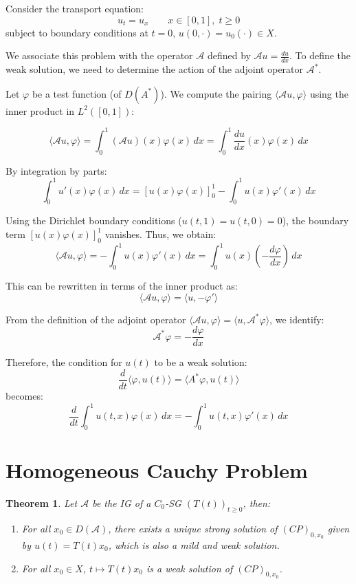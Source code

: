\documentclass[12pt, oneside]{book}
\newtheorem{theo}{Theorem}[section]
\newcommand{\A}{\mathscr{A}}
\begin{document}
\begin{example}
Consider the transport equation:
$$
u_t = u_x \quad\quad x \in [0,1], \; t \ge 0
$$
subject to boundary conditions at $t=0$, $u(0, \cdot) = u_0(\cdot) \in X$.

We associate this problem with the operator $\A$ defined by $\A u = \frac{du}{dx}$. To define the weak solution, we need to determine the action of the adjoint operator $\A^*$.

Let $\varphi$ be a test function (of $D(A^*)$). We compute the pairing $\langle \A u, \varphi \rangle$ using the inner product in $L^2([0,1])$:

$$ \langle \A u, \varphi \rangle = \int_0^1 (\A u)(x) \varphi(x) \, dx = \int_0^1 \frac{du}{dx}(x) \varphi(x) \, dx $$

By integration by parts:
$$ \int_0^1 u'(x) \varphi(x) \, dx = \left[ u(x)\varphi(x) \right]_0^1 - \int_0^1 u(x) \varphi'(x) \, dx $$

Using the Dirichlet boundary conditions ($u(t,1) = u(t,0) = 0$), the boundary term $\left[ u(x)\varphi(x) \right]_0^1$ vanishes. Thus, we obtain:
$$ \langle \A u, \varphi \rangle = - \int_0^1 u(x) \varphi'(x) \, dx = \int_0^1 u(x) \left( -\frac{d\varphi}{dx} \right) \, dx $$

This can be rewritten in terms of the inner product as:
$$ \langle \A u, \varphi \rangle = \langle u, -\varphi' \rangle $$

From the definition of the adjoint operator $\langle \A u, \varphi \rangle = \langle u, \A^* \varphi \rangle$, we identify:
$$ \A^* \varphi = -\frac{d\varphi}{dx} $$

Therefore, the condition for $u(t)$ to be a weak solution:
$$ \frac{d}{dt} \langle \varphi, u(t) \rangle = \langle A^* \varphi, u(t) \rangle $$
becomes:
$$ \frac{d}{dt} \int_0^1 u(t,x) \varphi(x) \, dx = -\int_0^1 u(t,x) \varphi'(x) \, dx $$
\end{example}

\pagebreak

\section{Homogeneous Cauchy Problem}

\begin{theo} \label{app:sol}
Let $\A$ be the IG of a $C_0$-SG $(T(t))_{t \ge 0}$, then: 
\begin{enumerate}
	\item \label{app:stg} For all $x_0 \in D(\A)$, there exists a unique strong solution of $(CP)_{0,x_0}$ given by $u(t) = T(t)x_0$, which is also a mild and weak solution. 
	\item \label{app:weak} For all $x_0 \in X$, $t \mapsto T(t)x_0$ is a weak solution of $(CP)_{0,x_0}$. 
\end{enumerate}
\end{theo}
\end{document}
